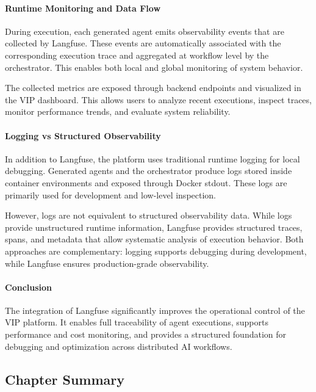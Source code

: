 \paragraph{Runtime Monitoring and Data Flow}

During execution, each generated agent emits observability events that are collected by Langfuse. These events are automatically associated with the corresponding execution trace and aggregated at workflow level by the orchestrator. This enables both local and global monitoring of system behavior.

The collected metrics are exposed through backend endpoints and visualized in the VIP dashboard. This allows users to analyze recent executions, inspect traces, monitor performance trends, and evaluate system reliability.

\paragraph{Logging vs Structured Observability}

In addition to Langfuse, the platform uses traditional runtime logging for local debugging. Generated agents and the orchestrator produce logs stored inside container environments and exposed through Docker stdout. These logs are primarily used for development and low-level inspection.

However, logs are not equivalent to structured observability data. While logs provide unstructured runtime information, Langfuse provides structured traces, spans, and metadata that allow systematic analysis of execution behavior. Both approaches are complementary: logging supports debugging during development, while Langfuse ensures production-grade observability.

\paragraph{Conclusion}

The integration of Langfuse significantly improves the operational control of the VIP platform. It enables full traceability of agent executions, supports performance and cost monitoring, and provides a structured foundation for debugging and optimization across distributed AI workflows.

\subsection{Chapter Summary}

